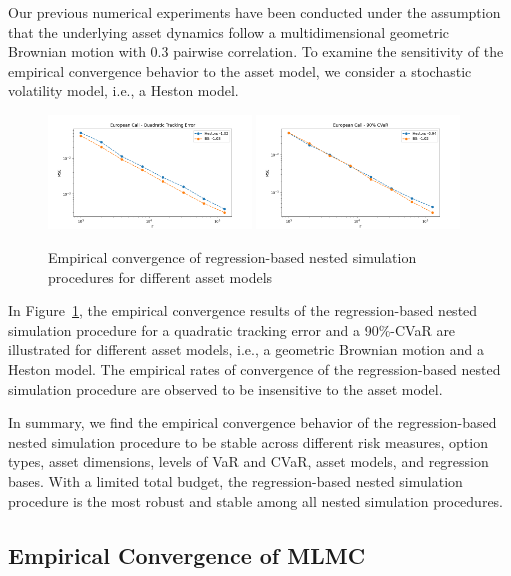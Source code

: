 Our previous numerical experiments have been conducted under the assumption that the underlying asset dynamics follow a multidimensional geometric Brownian motion with $0.3$ pairwise correlation.
To examine the sensitivity of the empirical convergence behavior to the asset model, we consider a stochastic volatility model, i.e., a Heston model.

\begin{figure}[ht!] 
    \centering
    \includegraphics[width=0.48\textwidth]{./project1/figures/figure10a.png}
    \includegraphics[width=0.48\textwidth]{./project1/figures/figure10b.png}
    \caption{Empirical convergence of regression-based nested simulation procedures for different asset models}
    \label{fig1:sens_model}
\end{figure}

In Figure~\ref{fig1:sens_model}, the empirical convergence results of the regression-based nested simulation procedure for a quadratic tracking error and a 90\%-CVaR are illustrated for different asset models, i.e., a geometric Brownian motion and a Heston model.
The empirical rates of convergence of the regression-based nested simulation procedure are observed to be insensitive to the asset model.

In summary, we find the empirical convergence behavior of the regression-based nested simulation procedure to be stable across different risk measures, option types, asset dimensions, levels of VaR and CVaR, asset models, and regression bases.
With a limited total budget, the regression-based nested simulation procedure is the most robust and stable among all nested simulation procedures. 

\subsection{Empirical Convergence of MLMC} \label{sec1:empirical-mlmc}

